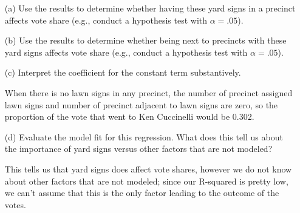 \documentclass[12pt,letterpaper]{article}
\begin{document}
\vspace{.5cm}
\begin{enumerate}
	\item [(a)] Use the results to determine whether having these yard signs in a precinct affects vote share (e.g., conduct a hypothesis test with $\alpha = .05$).
	
		
	\vspace{.5cm}			
	
	\item [(b)]  Use the results to determine whether being
	next to precincts with these yard signs affects vote
	share (e.g., conduct a hypothesis test with $\alpha = .05$).
			
	\vspace{.5cm}
	
	\item [(c)] Interpret the coefficient for the constant term substantively.
	
	When there is no lawn signs in any precinct, the number of precinct assigned lawn signs and number of precinct adjacent to lawn signs are zero, so the proportion of the vote that went to Ken Cuccinelli would be 0.302.
	
	\vspace{.5cm}
	
	\item [(d)] Evaluate the model fit for this regression.  What does this	tell us about the importance of yard signs versus other factors that are not modeled?
	
	
	This tells us that yard signs does affect vote shares, however we do not know about other factors that are not modeled; since our R-squared is pretty low, we can't assume that this is the only factor leading to the outcome of the votes.			
\end{enumerate}  

\newpage
\end{document}
